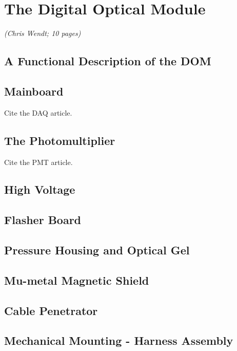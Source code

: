 
\section{The Digital Optical Module}
\label{sec:dom}
\textsl{(Chris Wendt; 10 pages)}

\subsection{A Functional Description of the DOM}

\subsection{Mainboard}
Cite the DAQ article\cite{ICECUBE:DAQ}.

\subsection{The Photomultiplier}
Cite the PMT article\cite{ICECUBE:PMT}.

\subsection{High Voltage}

\subsection{Flasher Board}

\subsection{Pressure Housing and Optical Gel}

\subsection{Mu-metal Magnetic Shield}

\subsection{Cable Penetrator}

\subsection{Mechanical Mounting - Harness Assembly}

